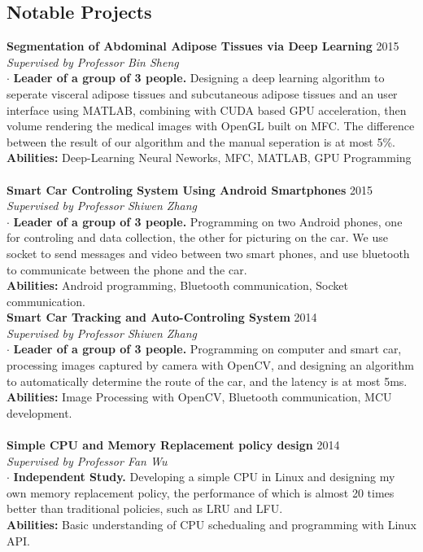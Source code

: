 \documentclass[a4paper,10pt]{article}
\begin{document}
\begin{CJK}{GBK}{song}
\section{Notable Projects}
\textbf{Segmentation of Abdominal Adipose Tissues via Deep Learning} \hfill 2015\\
\emph{Supervised by Professor Bin Sheng}\\
$\cdot$ \textbf{Leader of a group of 3 people.} Designing a deep learning algorithm to seperate visceral adipose tissues and subcutaneous adipose tissues and an user interface using MATLAB, combining with CUDA based GPU acceleration, then volume rendering the medical images with OpenGL built on MFC. The difference between the result of our algorithm and the manual seperation is at most 5\%.\\
\textbf{Abilities:} Deep-Learning Neural Neworks, MFC, MATLAB, GPU Programming\\\\
\textbf{Smart Car Controling System Using Android Smartphones} \hfill 2015\\
\emph{Supervised by Professor Shiwen Zhang}\\
$\cdot$ \textbf{Leader of a group of 3 people.} Programming on two Android phones, one for controling and data collection, the other for picturing on the car. We use socket to send messages and video between two smart phones, and use bluetooth to communicate between the phone and the car. \\
\textbf{Abilities:} Android programming, Bluetooth communication, Socket communication.\\
\textbf{Smart Car Tracking and Auto-Controling System} \hfill 2014\\
\emph{Supervised by Professor Shiwen Zhang}\\
$\cdot$ \textbf{Leader of a group of 3 people.}
Programming on computer and smart car, processing images captured by camera with OpenCV, and designing an algorithm to automatically determine the route of the car, and the latency is at most 5ms. \\
\textbf{Abilities:} Image Processing with OpenCV, Bluetooth communication, MCU development.\\\\
\textbf{Simple CPU and Memory Replacement policy design} \hfill 2014\\
\emph{Supervised by Professor Fan Wu}\\
$\cdot$ \textbf{Independent Study.}
Developing a simple CPU in Linux and designing my own memory replacement policy, the performance of which is almost 20 times better than traditional policies, such as LRU and LFU.\\
\textbf{Abilities:} Basic understanding of CPU schedualing and programming with Linux API.


\end{CJK}
\end{document}
